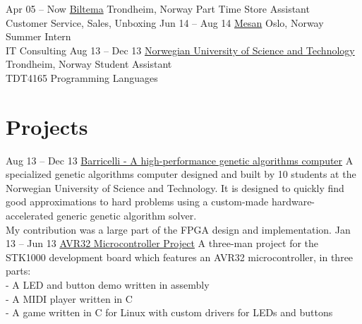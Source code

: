 \documentclass[print]{friggeri-cv}
\begin{document}
\begin{entrylist}
    \entry
        {Apr 05 – Now}
        {\href{http://biltema.no/}{Biltema}}
        {Trondheim, Norway}
        {Part Time Store Assistant\\
        Customer Service, Sales, Unboxing}
    \entry
        {Jun 14 – Aug 14}
        {\href{http://mesan.no/}{Mesan}}
        {Oslo, Norway}
        {Summer Intern\\
        IT Consulting}
    \entry
        {Aug 13 – Dec 13}
        {\href{http://ntnu.no/}{Norwegian University of Science and Technology}}
        {Trondheim, Norway}
        {Student Assistant\\
        TDT4165 Programming Languages}
\end{entrylist}

\section{Projects}

\begin{entrylist}
    \entry
        {Aug 13 – Dec 13}
        {\href{http://barricel.li/}{Barricelli - A high-performance genetic algorithms computer}}
        {}
        {A specialized genetic algorithms computer designed and built by 10 students at the Norwegian University of Science and Technology. It is designed to quickly find good approximations to hard problems using a custom-made hardware-accelerated generic genetic algorithm solver.\\
        My contribution was a large part of the FPGA design and implementation.}
    \entry
        {Jan 13 – Jun 13}
        {\href{https://github.com/lundal/avr32-project-2013}{AVR32 Microcontroller Project}}
        {}
        {A three-man project for the STK1000 development board which features an AVR32 microcontroller, in three parts:\\
        - A LED and button demo written in assembly\\
        - A MIDI player written in C\\
        - A game written in C for Linux with custom drivers for LEDs and buttons}
\end{entrylist}
\end{document}
